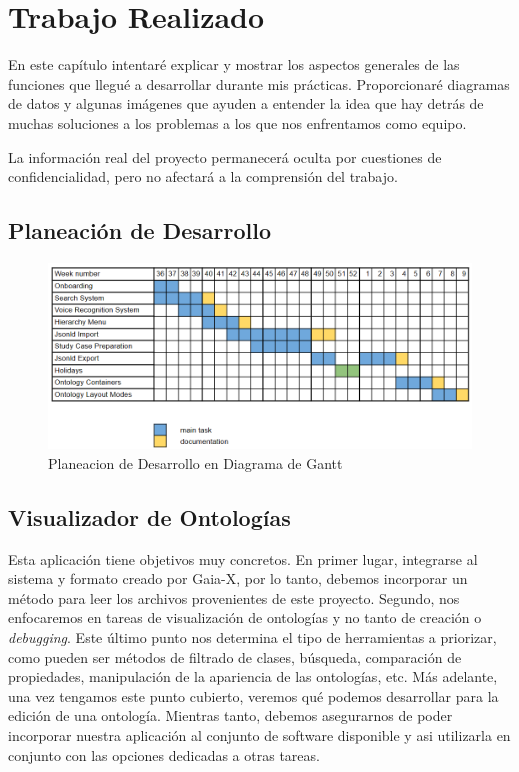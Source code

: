 \clearemptydoublepage
\chapter{Trabajo Realizado}

En este capítulo intentaré explicar y mostrar los aspectos generales de las funciones que llegué a desarrollar durante mis prácticas.
Proporcionaré diagramas de datos y algunas imágenes que ayuden a entender la idea que hay detrás de muchas soluciones a los problemas a los que nos enfrentamos como equipo.

La información real del proyecto permanecerá oculta por cuestiones de confidencialidad, pero no afectará a la comprensión del trabajo.

\section{Planeación de Desarrollo}

\begin{figure}[ht]
    \begin{center}
       \includegraphics[width=1\linewidth]{chapter2/figures/gantt.png}
    \end{center}
    \caption[Planeacion de Desarrollo en Diagrama de Gantt]
    {\footnotesize Planeacion de Desarrollo en Diagrama de Gantt}
    \label{fig:mufigure3}
 \end{figure}

\section{Visualizador de Ontologías}

Esta aplicación tiene objetivos muy concretos. En primer lugar, integrarse al sistema y formato creado por Gaia-X, por lo tanto, debemos incorporar un método para leer los archivos provenientes de este proyecto.
Segundo, nos enfocaremos en tareas de visualización de ontologías y no tanto de creación o \textit{debugging}. Este último punto nos determina el tipo de herramientas a priorizar, como pueden ser métodos de filtrado de clases,
búsqueda, comparación de propiedades, manipulación de la apariencia de las ontologías, etc. Más adelante, una vez tengamos este punto cubierto, veremos qué podemos desarrollar para la edición de una ontología. Mientras tanto, debemos
asegurarnos de poder incorporar nuestra aplicación al conjunto de software disponible y asi utilizarla en conjunto con las opciones dedicadas a otras tareas.

